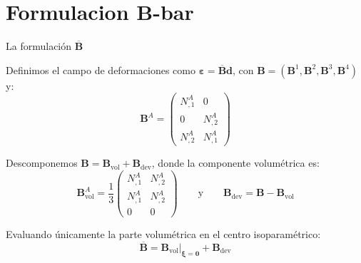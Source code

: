 \documentclass[10pt, aspectratio=43]{beamer}
\begin{document}
\section[B-Bar]{Formulacion B-bar}
\begin{frame}{La formulación $\overline{\bm{B}}$}
  \begin{uicard}[title=Descomposición aditiva de la matriz $\bm{B}$, top=2pt, bottom=3pt, left=6pt, right=6pt, attach title to upper={\par\vspace{0.05cm}}]
    \small
    Definimos el campo de deformaciones como $\bm{\varepsilon} = \overline{\bm{B}} \bm{d}$, con $\bm{B} = (\bm{B}^1, \bm{B}^2, \bm{B}^3, \bm{B}^4)$ y:
    $$\bm{B}^A = \begin{pmatrix} N_{,1}^A & 0 \\ 0 & N_{,2}^A \\ N_{,2}^A & N_{,1}^A \end{pmatrix}$$
  \end{uicard}

  \vspace{0.05cm}

  \begin{uicard}[title=Separación volumétrica-desviadora y evaluación, top=2pt, bottom=3pt, left=6pt, right=6pt, attach title to upper={\par\vspace{0.05cm}}]
    \small
    Descomponemos $\bm{B} = \bm{B}_{\text{vol}} + \bm{B}_{\text{dev}}$, donde la componente volumétrica es:
    $$\bm{B}_{\text{vol}}^A = \frac{1}{3} \begin{pmatrix} N_{,1}^A & N_{,2}^A \\ N_{,1}^A & N_{,2}^A \\ 0 & 0 \end{pmatrix} \qquad \text{y} \qquad \bm{B}_{\text{dev}} = \bm{B} - \bm{B}_{\text{vol}}$$

    Evaluando únicamente la parte volumétrica en el centro isoparamétrico:
    $$\overline{\bm{B}} = \left. \bm{B}_{\text{vol}} \right|_{\bm{\xi}=\bm{0}} + \bm{B}_{\text{dev}}$$
  \end{uicard}
\end{frame}

\end{document}
